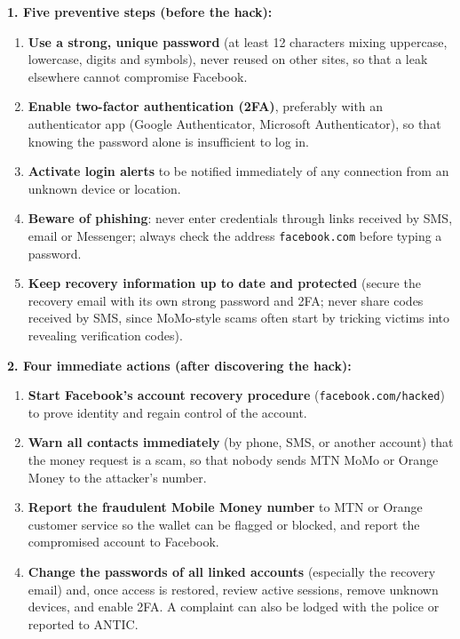 \documentclass[11pt]{article}
\begin{document}
\begin{corrige}
\textbf{1. Five preventive steps (before the hack):}
\begin{enumerate}
    \item \textbf{Use a strong, unique password} (at least 12 characters mixing uppercase, lowercase, digits and symbols), never reused on other sites, so that a leak elsewhere cannot compromise Facebook.
    \item \textbf{Enable two-factor authentication (2FA)}, preferably with an authenticator app (Google Authenticator, Microsoft Authenticator), so that knowing the password alone is insufficient to log in.
    \item \textbf{Activate login alerts} to be notified immediately of any connection from an unknown device or location.
    \item \textbf{Beware of phishing}: never enter credentials through links received by SMS, email or Messenger; always check the address \texttt{facebook.com} before typing a password.
    \item \textbf{Keep recovery information up to date and protected} (secure the recovery email with its own strong password and 2FA; never share codes received by SMS, since MoMo-style scams often start by tricking victims into revealing verification codes).
\end{enumerate}

\textbf{2. Four immediate actions (after discovering the hack):}
\begin{enumerate}
    \item \textbf{Start Facebook's account recovery procedure} (\texttt{facebook.com/hacked}) to prove identity and regain control of the account.
    \item \textbf{Warn all contacts immediately} (by phone, SMS, or another account) that the money request is a scam, so that nobody sends MTN MoMo or Orange Money to the attacker's number.
    \item \textbf{Report the fraudulent Mobile Money number} to MTN or Orange customer service so the wallet can be flagged or blocked, and report the compromised account to Facebook.
    \item \textbf{Change the passwords of all linked accounts} (especially the recovery email) and, once access is restored, review active sessions, remove unknown devices, and enable 2FA. A complaint can also be lodged with the police or reported to ANTIC.
\end{enumerate}
\end{corrige}
\end{document}
